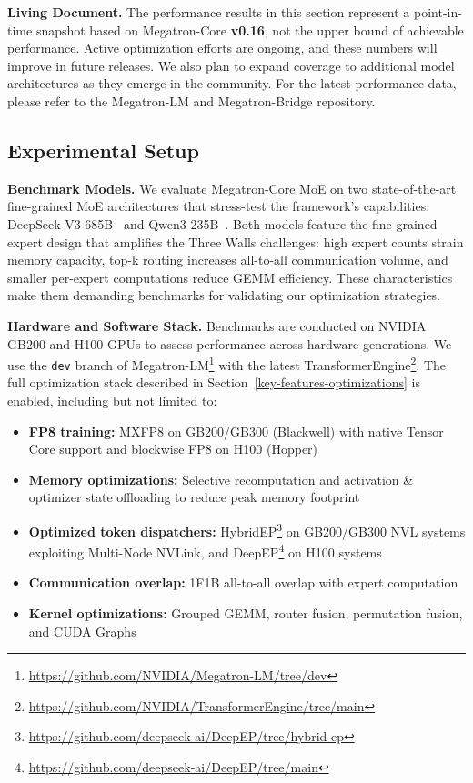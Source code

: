 \documentclass[10pt,logo,copyright]{nvidiatechreport}
\begin{document}
\begin{notebox}
\textbf{Living Document.} The performance results in this section represent a point-in-time snapshot based on Megatron-Core \textbf{v0.16}, not the upper bound of achievable performance. Active optimization efforts are ongoing, and these numbers will improve in future releases. We also plan to expand coverage to additional model architectures as they emerge in the community. For the latest performance data, please refer to the Megatron-LM and Megatron-Bridge repository.
\end{notebox}

\subsection{Experimental Setup}

\textbf{Benchmark Models.}
We evaluate Megatron-Core MoE on two state-of-the-art fine-grained MoE architectures that stress-test the framework's capabilities: DeepSeek-V3-685B~\cite{deepseekai2025deepseekv3technicalreport} and Qwen3-235B~\cite{qwen2025qwen25technicalreport,yang2025qwen3technicalreport}. Both models feature the fine-grained expert design that amplifies the Three Walls challenges: high expert counts strain memory capacity, top-k routing increases all-to-all communication volume, and smaller per-expert computations reduce GEMM efficiency. These characteristics make them demanding benchmarks for validating our optimization strategies.

\textbf{Hardware and Software Stack.}
Benchmarks are conducted on NVIDIA GB200 and H100 GPUs to assess performance across hardware generations. We use the \texttt{dev} branch of Megatron-LM\footnote{\url{https://github.com/NVIDIA/Megatron-LM/tree/dev}} with the latest TransformerEngine\footnote{\url{https://github.com/NVIDIA/TransformerEngine/tree/main}}. The full optimization stack described in Section~\ref{key-features-optimizations} is enabled, including but not limited to:
\begin{itemize}[noitemsep,topsep=0pt]
    \item \textbf{FP8 training:} MXFP8 on GB200/GB300 (Blackwell) with native Tensor Core support and blockwise FP8 on H100 (Hopper)
    \item \textbf{Memory optimizations:} Selective recomputation and activation \& optimizer state offloading to reduce peak memory footprint
    \item \textbf{Optimized token dispatchers:} HybridEP\footnote{\url{https://github.com/deepseek-ai/DeepEP/tree/hybrid-ep}} on GB200/GB300 NVL systems exploiting Multi-Node NVLink, and DeepEP\footnote{\url{https://github.com/deepseek-ai/DeepEP/tree/main}} on H100 systems
    \item \textbf{Communication overlap:} 1F1B all-to-all overlap with expert computation
    \item \textbf{Kernel optimizations:} Grouped GEMM, router fusion, permutation fusion, and CUDA Graphs
\end{itemize}
\end{document}
